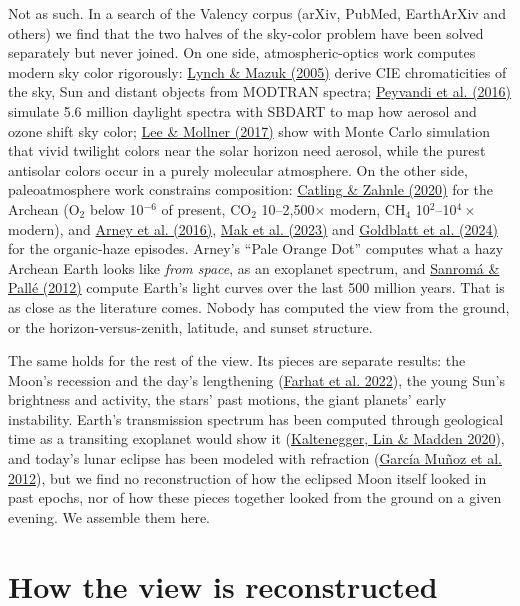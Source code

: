 \documentclass[9pt,twocolumn]{extarticle}
\begin{document}
Not as such. In a search of the Valency corpus (arXiv, PubMed, EarthArXiv and others) we find that the two halves of the sky-color problem have been solved separately but never joined. On one side, atmospheric-optics work computes modern sky color rigorously: \protect\hyperlink{cite.lynch2005}{Lynch \& Mazuk (2005)} derive CIE chromaticities of the sky, Sun and distant objects from MODTRAN spectra; \protect\hyperlink{cite.peyvandi2016}{Peyvandi et al. (2016)} simulate 5.6 million daylight spectra with SBDART to map how aerosol and ozone shift sky color; \protect\hyperlink{cite.lee2017}{Lee \& Mollner (2017)} show with Monte Carlo simulation that vivid twilight colors near the solar horizon need aerosol, while the purest antisolar colors occur in a purely molecular atmosphere. On the other side, paleoatmosphere work constrains composition: \protect\hyperlink{cite.catling2020}{Catling \& Zahnle (2020)} for the Archean (O$_2$ below 10$^{-6}$ of present, CO$_2$ 10--2,500$\times$ modern, CH$_4$ 10$^{2}$--10$^{4}\times$ modern), and \protect\hyperlink{cite.arney2016}{Arney et al. (2016)}, \protect\hyperlink{cite.mak2023}{Mak et al. (2023)} and \protect\hyperlink{cite.goldblatt2024}{Goldblatt et al. (2024)} for the organic-haze episodes. Arney's ``Pale Orange Dot'' computes what a hazy Archean Earth looks like \emph{from space}, as an exoplanet spectrum, and \protect\hyperlink{cite.sanroma2012}{Sanromá \& Pallé (2012)} compute Earth's light curves over the last 500 million years. That is as close as the literature comes. Nobody has computed the view from the ground, or the horizon-versus-zenith, latitude, and sunset structure.

The same holds for the rest of the view. Its pieces are separate results: the Moon's recession and the day's lengthening (\protect\hyperlink{cite.farhat2022}{Farhat et al. 2022}), the young Sun's brightness and activity, the stars' past motions, the giant planets' early instability. Earth's transmission spectrum has been computed through geological time as a transiting exoplanet would show it (\protect\hyperlink{cite.kaltenegger2020}{Kaltenegger, Lin \& Madden 2020}), and today's lunar eclipse has been modeled with refraction (\protect\hyperlink{cite.garciamunoz2012}{García Muñoz et al. 2012}), but we find no reconstruction of how the eclipsed Moon itself looked in past epochs, nor of how these pieces together looked from the ground on a given evening. We assemble them here.


\section{How the view is reconstructed}\label{method}
\end{document}
